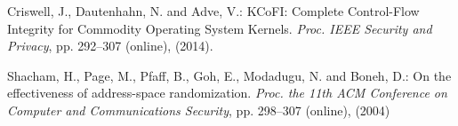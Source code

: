 \documentclass[english,sigrecommended,JIP]{ipsj}
\begin{document}
\begin{thebibliography}{99}
  Criswell, J., Dautenhahn, N. and Adve, V.: KCoFI: Complete Control-Flow Integrity for Commodity Operating System Kernels. \textit{Proc. IEEE Security and Privacy}, pp. 292--307 (online),  (2014).


  Shacham, H., Page, M., Pfaff, B., Goh, E., Modadugu, N. and Boneh, D.: On the effectiveness of address-space randomization. \textit{Proc. the 11th ACM Conference on Computer and Communications Security}, pp. 298--307 (online),  (2004)
  

\end{thebibliography}
\end{document}
